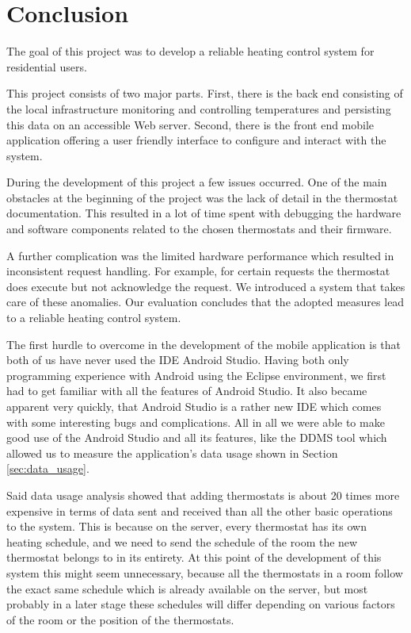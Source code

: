 
\chapter{Conclusion}
\label{sec:conclusion}


The goal of this project was to develop a reliable heating control system for residential users.

This project consists of two major parts.
First, there is the back end consisting of the local infrastructure monitoring and controlling temperatures and persisting this data on an accessible Web server.
Second, there is the front end mobile application offering a user friendly interface to configure and interact with the system.

During the development of this project a few issues occurred.
One of the main obstacles at the beginning of the project was the lack of detail in the thermostat documentation.
This resulted in a lot of time spent with debugging the hardware and software components related to the chosen thermostats and their firmware.

A further complication was the limited hardware performance which resulted in inconsistent request handling.
For example, for certain requests the thermostat does execute but not acknowledge the request.
We introduced a system that takes care of these anomalies.
Our evaluation concludes that the adopted measures lead to a reliable heating control system.

The first hurdle to overcome in the development of the mobile application is that both of us have never used the IDE Android Studio. Having both only programming experience with Android using the Eclipse environment, we first had to get familiar with all the features of Android Studio. It also became apparent very quickly, that Android Studio is a rather new IDE which comes with some interesting bugs and complications. All in all we were able to make good use of the Android Studio and all its features, like the DDMS tool which allowed us to measure the application's data usage shown in Section \ref{sec:data_usage}.

Said data usage analysis showed that adding thermostats is about 20 times more expensive in terms of data sent and received than all the other basic operations to the system. This is because on the server, every thermostat has its own heating schedule, and we need to send the schedule of the room the new thermostat belongs to in its entirety. At this point of the development of this system this might seem unnecessary, because all the thermostats in a room follow the exact same schedule which is already available on the server, but most probably in a later stage these schedules will differ depending on various factors of the room or the position of the thermostats.

